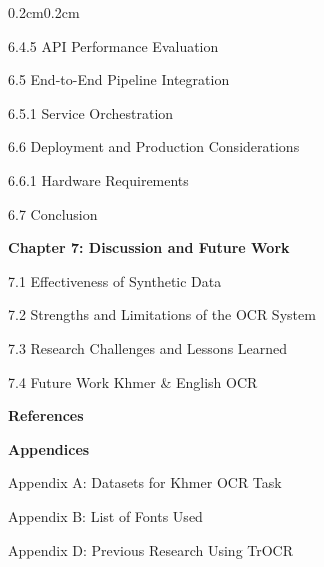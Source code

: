 {\begin{adjustwidth}{0.2cm}{0.2cm}
    { \hspace{1cm} 6.4.5 API Performance Evaluation\dotfill\pageref{subsec:api-performance-evaluation}\par}
    { \hspace{0.5cm} 6.5 End-to-End Pipeline Integration\dotfill\pageref{sec:pipeline-integration}\par}
    { \hspace{1cm} 6.5.1 Service Orchestration\dotfill\pageref{subsec:orchestration}\par}
    { \hspace{0.5cm} 6.6 Deployment and Production Considerations\dotfill\pageref{sec:deployment}\par}
    { \hspace{1cm} 6.6.1 Hardware Requirements\dotfill\pageref{subsec:hardware}\par}
    { \hspace{0.5cm} 6.7 Conclusion\dotfill\pageref{sec:conclusion}\par}

    \vspace{0.5cm}
    { \textbf{Chapter 7: Discussion and Future Work}\dotfill\pageref{ch:discussion}\par}
    { \hspace{0.5cm} 7.1 Effectiveness of Synthetic Data\dotfill\pageref{sec:effectiveness}\par}
    { \hspace{0.5cm} 7.2 Strengths and Limitations of the OCR System\dotfill\pageref{sec:strengths}\par}
    { \hspace{0.5cm} 7.3 Research Challenges and Lessons Learned\dotfill\pageref{sec:challenges}\par}
    { \hspace{0.5cm} 7.4 Future Work Khmer \& English OCR\dotfill\pageref{sec:impact}\par}

    \vspace{0.5cm}
    { \textbf{References}\dotfill\pageref{ch:references}\par}

    \vspace{0.5cm}
    { \textbf{Appendices}\par}
    { \hspace{0.5cm} Appendix A: Datasets for Khmer OCR Task\dotfill\pageref{appendix-a}\par}
    { \hspace{0.5cm} Appendix B: List of Fonts Used\dotfill\pageref{appendix-b}\par}
    { \hspace{0.5cm} Appendix D: Previous Research Using TrOCR\dotfill\pageref{appendix-d}\par}

\end{adjustwidth}

}